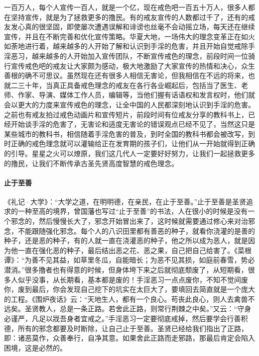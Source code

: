 一百万人，每个人宣传一百人，就是一个亿，现在戒色吧一百五十万人，很多人都在坚持宣传，就是为了拯救更多的撸民。有的戒友宣传的人数都过千了，还有的戒友发心真的很坚固，即使屡次遭遇误解和诽谤也丝毫不会动摇立场，每天还在继续宣传，并且在不断完善和优化宣传策略。华夏大地，一场伟大的理念变革正在如火如荼地进行着，越来越多的人开始了解和认识到手淫的危害，并且开始自觉戒除手淫恶习，越来越多的人开始加入宣传团队，不断宣传戒色的理念，前段时间一位骑行宣传戒色吧的戒友让大家颇为感动，极大地激励了大家宣传的热情和决心，众生善根的确不可思议。虽然现在还有很多人相信无害论，但我相信在不远的将来，也就二三十年，当真正具备戒色理念的戒友在各行各业崛起后，包括当了医生、老师、作家、导演、媒体工作人员，编辑等，当他们握有话语权和发言权时，他们就会以更大的力度来宣传戒色的理念，让全中国的人民都深刻地认识到手淫的危害。之前也有戒友拍过戒色动画片和宣传短片，前段时间有位戒友分享的教科书上，已经开始谈手淫的危害了，无害论和适度无害论的错误观点已经不见了，当然这只是某些城市的教科书，相信随着手淫危害的普及，到时全国的教科书都会被改写，到时正确的戒色理念就可以灌输给正在发育期的孩子们，让他们从一开始就得到正确的引导。星星之火可以燎原，我们这几代人一定要好好努力，让我们一起拯救更多的撸民，让我们不断传承古圣先贤高度智慧的戒色理念。

\paragraph{止于至善}

《礼记·大学》：“大学之道，在明明德，在亲民，在止于至善。”止于至善是圣贤追求的一种至高的境界，曾国藩也写过“止于至善”的书法，人在很小的时候是没有一个邪念的，然后慢慢长大了，邪念开始冒出来了，这时候就需要通过修心来对治邪念，不能跟随强化邪念。每个人的八识田里都有善恶的种子，就看你浇灌的是善的种子，还是恶的种子，有的人就一直在浇灌恶的种子，他之所以成为恶人，就是因为他一直在强化恶的种子，最后结出恶之花、恶之果，自己把自己给害了。《菜根谭》：“为善不见其益，如草里冬瓜，自能暗长；为恶不见其损，如庭前春雪，势必潜消。”很多撸者也有得意的时候，但身体垮下来之后就彻底颓废了，从短期看，很多人似乎没事，从长期看，基本都是废的！手淫恶习一点点废你，不知不觉间废你，废到最后，你会发现自己挖下的坑实在太巨大了，要填回去简直就是一个庞大的工程。《围炉夜话》云：“天地生人，都有一个良心。苟丧此良心，则人去禽兽不远矣。圣贤教人，总是一条正路。若舍此正路，则常行荆棘之中矣。”又云：“守身必谨严，凡足以戕吾身者宜戒之。”手淫恶习一定要彻底戒掉，然后要学会行善积德，所有的邪念都要及时断除，让自己止于至善。圣贤已经给我们指出了正路，即：诸恶莫作，众善奉行，自净其意。如果舍此正路而走邪路，那最后肯定会陷入困境，这是必然的。

